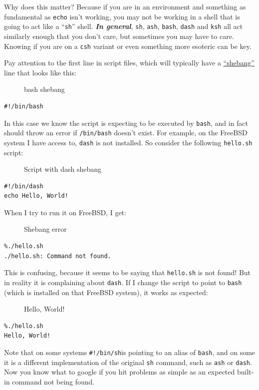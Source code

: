 \documentclass[10pt,]{book}
\numberwithin{figure}{chapter}
\DeclareRobustCommand{\drcap}[1]{\begin{figure}[H]\caption{#1}\end{figure}}
\DeclareRobustCommand{\drcmd}[1]{\index{Commands!#1}}
\DeclareRobustCommand{\drshl}[1]{\index{Shells!#1}}
\begin{document}
Why does this matter? Because if you are in an environment and something
as fundamental as \texttt{echo}\drcmd{echo} isn't working, you may not
be working in a shell that is going to act like a ``\texttt{sh}'' shell.
\textbf{\emph{In general}}, \texttt{sh}, \texttt{ash}, \texttt{bash},
\texttt{dash} and \texttt{ksh} all act similarly enough that you don't
care, but sometimes you may have to care. Knowing if you are on a
\texttt{csh}\drshl{csh} variant or even something more esoteric can be
key.

Pay attention to the first line in script files, which will typically
have a
\href{https://en.wikipedia.org/wiki/Shebang_\%28Unix\%29}{``shebang''}
line that looks like this:

\drcap{bash shebang}

\begin{verbatim}
#!/bin/bash
\end{verbatim}

In this case we know the script is expecting to be executed by
\texttt{bash}, and in fact should throw an error if \texttt{/bin/bash}
doesn't exist. For example, on the FreeBSD system I have access to,
\texttt{dash} is not installed. So consider the following
\texttt{hello.sh} script:

\drcap{Script with dash shebang}

\begin{verbatim}
#!/bin/dash
echo Hello, World!
\end{verbatim}

When I try to run it on FreeBSD, I get:

\drcap{Shebang error}

\begin{verbatim}
%./hello.sh
./hello.sh: Command not found.
\end{verbatim}

This is confusing, because it seems to be saying that \texttt{hello.sh}
is not found! But in reality it is complaining about \texttt{dash}. If I
change the script to point to \texttt{bash} (which is installed on that
FreeBSD system), it works as expected:

\drcap{Hello, World!}

\begin{verbatim}
%./hello.sh 
Hello, World!
\end{verbatim}

Note that on some systems \texttt{\#!/bin/sh}is pointing to an alias of
\texttt{bash}, and on some it is a different implementation of the
original \texttt{sh} command, such as \texttt{ash} or \texttt{dash}. Now
you know what to google if you hit problems as simple as an expected
built-in command not being found.
\end{document}
